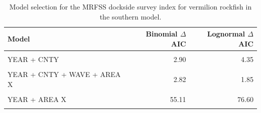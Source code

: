 \documentclass[11pt,
  english,
]{article}
\begin{document}
\begin{table}

\caption{\label{tab:tab-model-select-mrfss}Model selection for the MRFSS dockside survey index for vermilion rockfish in the southern model.}
\centering
\begin{tabular}[t]{lrr}
\toprule
Model & Binomial $\Delta$AIC & Lognormal $\Delta$AIC\\
\midrule
\cellcolor{gray!6}{1} & \cellcolor{gray!6}{111.56} & \cellcolor{gray!6}{146.83}\\
YEAR + CNTY & 2.90 & 4.35\\
\cellcolor{gray!6}{YEAR + CNTY + WAVE} & \cellcolor{gray!6}{6.40} & \cellcolor{gray!6}{0.00}\\
YEAR + CNTY + WAVE + AREA X & 2.82 & 1.85\\
\cellcolor{gray!6}{YEAR + WAVE + AREA X} & \cellcolor{gray!6}{57.46} & \cellcolor{gray!6}{75.30}\\
\addlinespace
YEAR + AREA X & 55.11 & 76.60\\
\cellcolor{gray!6}{YEAR + CNTY + AREA X} & \cellcolor{gray!6}{0.00} & \cellcolor{gray!6}{6.19}\\
\bottomrule
\end{tabular}
\end{table}

\FloatBarrier
\end{document}
